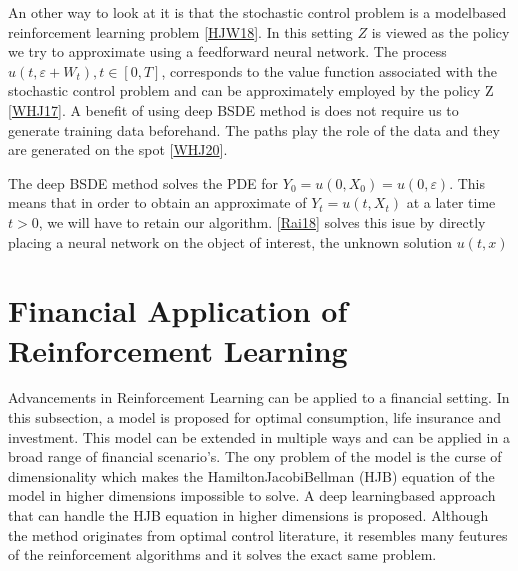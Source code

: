 \documentclass[letterpaper,10pt,english]{jupyterBook}
\begin{document}
\sphinxAtStartPar
An other way to look at it is that the stochastic control problem is a model\sphinxhyphen{}based reinforcement learning problem {[}\hyperlink{cite.Discussion:id30}{HJW18}{]}. In this setting \(Z\) is viewed as the policy we try to approximate using a feedforward neural network. The process \(u(t, \varepsilon + W_t), t \in [0, T]\), corresponds to the value function associated with the stochastic control problem and can be approximately employed by the policy Z {[}\hyperlink{cite.Discussion:id29}{WHJ17}{]}. A benefit of using deep BSDE method is does not require us to generate training data beforehand. The paths play the role of the data and they are generated on the spot {[}\hyperlink{cite.Discussion:id28}{WHJ20}{]}.

\sphinxAtStartPar
The deep BSDE method solves the PDE for \(Y_0= u(0, X_0) = u(0, \varepsilon)\). This means that in order to obtain an approximate of \(Y_t = u(t,X_t)\) at a later time \(t>0\), we will have to retain our algorithm. {[}\hyperlink{cite.Discussion:id26}{Rai18}{]} solves this isue by directly placing a neural network on the object of interest, the unknown solution \(u(t,x)\)


\chapter{Financial Application of Reinforcement Learning}
\label{\detokenize{Financial_application:financial-application-of-reinforcement-learning}}\label{\detokenize{Financial_application::doc}}
\sphinxAtStartPar
Advancements in Reinforcement Learning can be applied to a financial setting. In this subsection, a model is proposed for optimal consumption, life insurance and investment. This model can be extended in multiple ways and can be applied in a broad range of financial scenario’s. The ony problem of the model is the curse of dimensionality which makes the Hamilton\sphinxhyphen{}Jacobi\sphinxhyphen{}Bellman (HJB) equation of the model in higher dimensions impossible to solve. A deep learning\sphinxhyphen{}based approach that can handle the HJB equation in higher dimensions is proposed. Although the method originates from optimal control literature, it resembles many feutures of the reinforcement algorithms and it solves the exact same problem.
\end{document}
